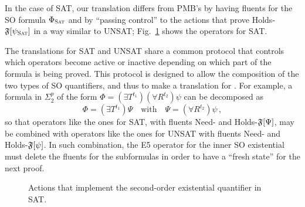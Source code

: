 In the case of SAT, our translation differs from PMB's by
having fluents for the SO formula $\Phi_{\textsc{Sat}}$ and by ``passing control''
to the actions
that prove Holds-$\mathfrak{F}[\psi_{\textsc{Sat}}]$ in a way similar to UNSAT;
Fig.~\ref{fig:sat} shows the operators for SAT.

The translations for SAT and UNSAT share a common protocol
that controls which operators become active or inactive
depending on which part of the formula is being proved.
This protocol is designed to allow the composition of
the two types of SO quantifiers, and thus to make a
translation for \PH.
For example, a formula in $\Sigma^p_2$ of the form
$\Phi=(\exists T^{t_1})(\forall R^{t_2})\psi$ can
be decomposed as
\begin{equation}
\Phi = (\exists T^{t_1})\Psi \quad\text{with}\quad \Psi = (\forall R^{t_2})\psi \,, 
\end{equation}
so that operators like the ones for SAT, with fluents
Need- and Holds-$\mathfrak{F}[\Psi]$, may be combined with operators
like the ones for UNSAT with fluents Need- and Holds-$\mathfrak{F}[\psi]$.
In such combination, the E5 operator for the inner SO
existential must delete the fluents for the subformulas in
order to have a ``fresh state'' for the next proof.

\begin{figure}[t]
\centering
{}
\caption{Actions that implement the second-order existential
  quantifier in SAT.}
\label{fig:sat}
\end{figure}
 
